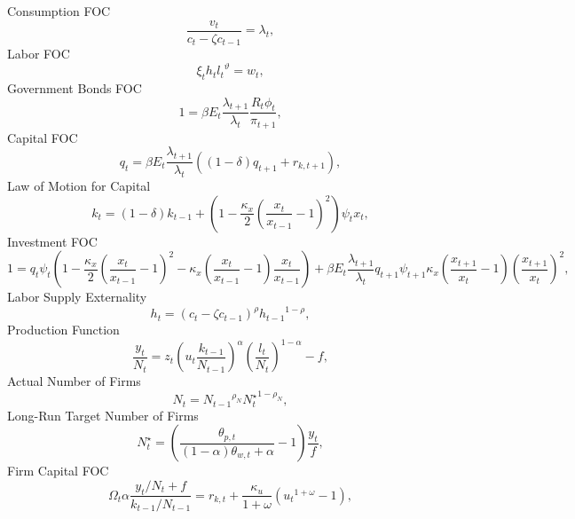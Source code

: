 \documentclass[10pt]{article}
\begin{document}
Consumption FOC
\begin{equation}
    \frac{v_{t}}{c_{t}-\zeta c_{t-1}} = \lambda_{t},
\end{equation}
Labor FOC
\begin{equation}
    \xi_{t}h_{t}{l_{t}}^{\vartheta} = w_{t},
\end{equation}
Government Bonds FOC
\begin{equation}
    1 = \beta E_{t}\frac{\lambda_{t+1}}{\lambda_{t}}\frac{R_{t}\phi_{t}}{\pi_{t+1}},
\end{equation}
Capital FOC
\begin{equation}
    q_{t} = \beta E_{t}\frac{\lambda_{t+1}}{\lambda_{t}}\left( \left(1-\delta\right)q_{t+1} + r_{k,t+1}\right),
\end{equation}
Law of Motion for Capital
\begin{equation}
    k_{t} = \left(1-\delta\right)k_{t-1} + \left(1 - \frac{\kappa_{x}}{2}\left(\frac{x_{t}}{x_{t-1}}-1 \right)^{2}\right)\psi_{t}x_{t},
\end{equation}
Investment FOC
\begin{equation}
    1 = q_{t}\psi_{t}\left(1 - \frac{\kappa_{x}}{2}\left(\frac{x_{t}}{x_{t-1}}-1\right)^{2}  - \kappa_{x}\left(\frac{x_{t}}{x_{t-1}}-1 \right)\frac{x_{t}}{x_{t-1}} \right) + \beta E_{t}\frac{\lambda_{t+1}}{\lambda_{t}}q_{t+1}\psi_{t+1}\kappa_{x}\left( \frac{x_{t+1}}{x_{t}}-1\right)\left(\frac{x_{t+1}}{x_{t}}\right)^{2},
\end{equation}
Labor Supply Externality
\begin{equation}
    h_{t} = \left(c_{t} - \zeta c_{t-1}\right)^{\rho}{h_{t-1}}^{1-\rho},
\end{equation}
Production Function
\begin{equation}
    \frac{y_{t}}{N_{t}} = z_{t}\left( u_{t}\frac{k_{t-1}}{N_{t-1}}\right)^{\alpha}\left(\frac{l_{t}}{N_{t}}\right)^{1-\alpha}-f,
\end{equation}
Actual Number of Firms
\begin{equation}
    N_{t} = {N_{t-1}}^{\rho_{N}}{N_{t}^{\star}}^{1-\rho_{N}},
\end{equation}
Long-Run Target Number of Firms
\begin{equation}
    N_{t}^{\star}=\left(\frac{\theta_{p,t}}{\left(1-\alpha\right)\theta_{w,t}+\alpha}-1 \right)\frac{y_{t}}{f},
\end{equation}
Firm Capital FOC
\begin{equation}
    \Omega_{t}\alpha\frac{y_{t}/N_{t}+f}{k_{t-1}/N_{t-1}} = r_{k,t} + \frac{\kappa_{u}}{1+\omega}\left({u_{t}}^{1+\omega}-1\right),
\end{equation}
\end{document}
